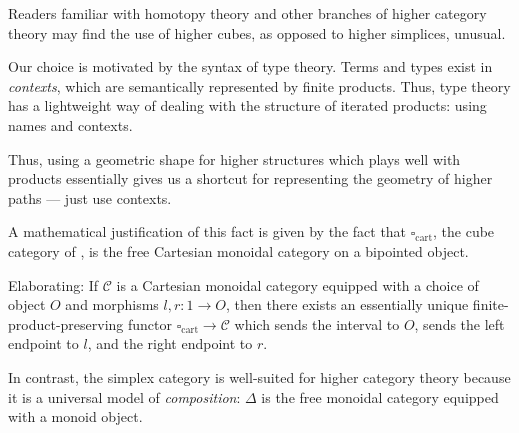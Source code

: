\begin{node}
%
Readers familiar with homotopy theory and other branches of higher
category theory may find the use of higher cubes, as opposed to higher
simplices, unusual.
%
\end{node}

\begin{node}
%
Our choice is motivated by the syntax of type theory. Terms and types
exist in \emph{contexts}, which are semantically represented by finite
products. Thus, type theory has a lightweight way of dealing with the
structure of iterated products: using names and contexts.

Thus, using a geometric shape for higher structures which plays well
with products essentially gives us a shortcut for representing the
geometry of higher paths --- just use contexts.
%
\end{node}

\begin{node}
%
A mathematical justification of this fact is given by the fact that
\(\square_\mathrm{cart}\), the cube category of \cite{ABCFHL:2021}, is
the free Cartesian monoidal category on a bipointed object.

Elaborating: If \(\mathcal{C}\) is a Cartesian monoidal category
equipped with a choice of object \(O\) and morphisms \(l, r : 1 \to O\),
then there exists an essentially unique finite-product-preserving
functor \(\square_\mathrm{cart} \to \mathcal{C}\) which sends the
interval to \(O\), sends the left endpoint to \(l\), and the right
endpoint to \(r\).
%
\end{node}

\begin{remark}
In contrast, the simplex category is well-suited for higher category
theory because it is a universal model of \emph{composition}: \(\Delta\)
is the free monoidal category equipped with a monoid object.
\end{remark}
